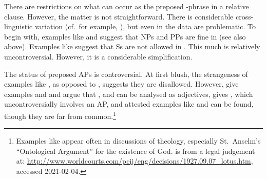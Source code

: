 \documentclass[output=paper
 	        ,biblatex
                ,babelshorthands
                ,newtxmath
                ,draftmode
                ,colorlinks, citecolor=brown
]{langscibook}
\begin{document}
There are restrictions on what can occur as the preposed -phrase in a relative
clause. However, the matter is not straightforward. There is considerable cross-linguistic
variation (cf.\ for example, \citealt[Section~4.3]{Webelhuth92a-u}), but even in  the data are
problematic. To begin with, examples like  and  suggest that NPs and PPs
are fine in  (see also  above). Examples like 
suggest that Ss are not allowed in . This much is relatively
uncontroversial. However, it is a considerable simplification.
\begin{exe}\ex\begin{xlist}\label{x:rc-23}
 \label{x:rc-24}
 \label{x:rc-25}
 \label{x:rc-28}
\end{xlist}\end{exe}
The status of preposed APs is controversial. At first blush, the
strangeness of examples like , as opposed to , suggests
they are disallowed.
\eal
{}
\label{x:rc-240}
\label{x:rc-241}
\zl
However, \citet[311]{NanniStillings78} give examples  and 
and argue that , and  can be analysed as adjectives,
\citet[129]{Webelhuth92a-u} gives , which uncontroversially involves an AP,
and attested examples like  and  can be found, though they
are far from common.\footnote{Examples like  appear often in discussions of
  theology, especially St.\ Anselm's ``Ontological Argument'' for the existence of
  God.  is from a legal judgement at:
  \url{http://www.worldcourts.com/pcij/eng/decisions/1927.09.07_lotus.htm}, accessed 2021-02-04.}
\begin{exe}\ex\begin{xlist}\label{x:rc-230}
    \label{x:rc-231}
    \label{x:rc-232}
    \label{x:rc-233}
     \label{x:rc-234}
    \label{x:rc-235} 
  \end{xlist}\end{exe}
\end{document}
